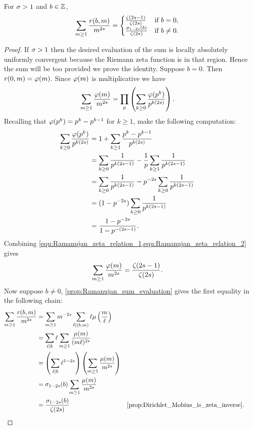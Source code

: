       \begin{lemma}\label{lem:Ramanujan_zeta_relation}
        For $\sigma > 1$ and $b \in \mathbb{Z}$,
        \[
          \sum_{m \ge 1}\frac{r(b,m)}{m^{2s}} = \begin{cases} \frac{\zeta(2s-1)}{\zeta(2s)} & \text{if $b = 0$}, \\ \frac{\sigma_{1-2s}(b)}{\zeta(2s)} & \text{if $b \neq 0$}. \end{cases}
        \]
      \end{lemma}
      \begin{proof}
        If $\sigma > 1$ then the desired evaluation of the sum is locally absolutely uniformly convergent because the Riemann zeta function is in that region. Hence the sum will be too provided we prove the identity. Suppose $b = 0$. Then $r(0,m) = \varphi(m)$. Since $\varphi(m)$ is multiplicative we have
        \begin{equation}\label{equ:Ramanujan_zeta_relation_1}
          \sum_{m \ge 1}\frac{\varphi(m)}{m^{2s}} = \prod_{p}\left(\sum_{k \ge 0}\frac{\varphi(p^{k})}{p^{k(2s)}}\right).
        \end{equation}
        Recalling that $\varphi(p^{k}) = p^{k}-p^{k-1}$ for $k \ge 1$, make the following computation:
        \begin{equation}\label{equ:Ramanujan_zeta_relation_2}
          \begin{aligned}
            \sum_{k \ge 0}\frac{\varphi(p^{k})}{p^{k(2s)}} &= 1+\sum_{k \ge 1}\frac{p^{k}-p^{k-1}}{p^{k(2s)}} \\
            &= \sum_{k \ge 0}\frac{1}{p^{k(2s-1)}}-\frac{1}{p}\sum_{k \ge 1}\frac{1}{p^{k(2s-1)}} \\
            &= \sum_{k \ge 0}\frac{1}{p^{k(2s-1)}}-p^{-2s}\sum_{k \ge 0}\frac{1}{p^{k(2s-1)}} \\
            &= (1-p^{-2s})\sum_{k \ge 0}\frac{1}{p^{k(2s-1)}} \\
            &= \frac{1-p^{-2s}}{1-p^{-(2s-1)}}.
          \end{aligned}
        \end{equation}
        Combining \cref{equ:Ramanujan_zeta_relation_1,equ:Ramanujan_zeta_relation_2} gives
        \[
          \sum_{m \ge 1}\frac{\varphi(m)}{m^{2s}} = \frac{\zeta(2s-1)}{\zeta(2s)}.
        \]
        Now suppose $b \neq 0$, \cref{prop:Ramanujan_sum_evaluation} gives the first equality in the following chain:
        \begin{align*}
          \sum_{m \ge 1}\frac{r(b,m)}{m^{2s}} &= \sum_{m \ge 1}m^{-2s}\sum_{\ell \mid (b,m)}\ell\mu\left(\frac{m}{\ell}\right) \\
          &= \sum_{\ell \mid b}\ell\sum_{m \ge 1}\frac{\mu(m)}{(m\ell)^{2s}} \\
          &= \left(\sum_{\ell \mid b}\ell^{1-2s}\right)\left(\sum_{m \ge 1}\frac{\mu(m)}{m^{2s}}\right) \\
          &= \s_{1-2s}(b)\sum_{m \ge 1}\frac{\mu(m)}{m^{2s}} \\
          &= \frac{\s_{1-2s}(b)}{\z(2s)} && \text{\cref{prop:Dirichlet_Mobius_is_zeta_inverse}}.
        \end{align*}
      \end{proof}


